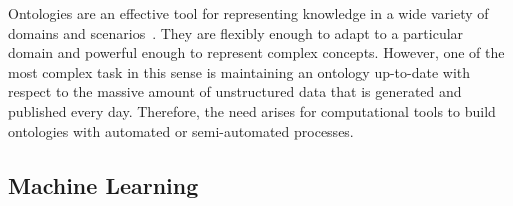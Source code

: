 
    Ontologies are an effective tool for representing knowledge in a wide
    variety of domains and scenarios~\cite{staab2010handbook}.
    They are flexibly enough to adapt to a particular domain and powerful enough to represent complex concepts.
    However, one of the most complex task in this sense is maintaining
    an ontology up-to-date with respect to the massive amount of unstructured data that is generated and published every day.
	Therefore, the need arises for computational tools to build ontologies with automated or semi-automated processes.

	\subsection{Machine Learning}

